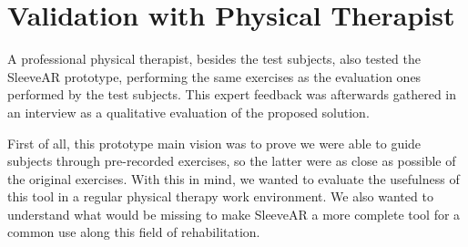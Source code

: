 \begin{table}[!t]
\centering
{}
\caption{T-Student Test for all exercises. SleeveAR(S), Video(V)}
\label{table:ttest}
\end{table}


\section{Validation with Physical Therapist}
\label{sec:pt}

A professional physical therapist, besides the test subjects, also tested the SleeveAR prototype, performing the same exercises as the evaluation ones performed by the test subjects. This expert feedback was afterwards gathered in an interview as a qualitative evaluation of the proposed solution.

First of all, this prototype main vision was to prove we were able to guide subjects through pre-recorded exercises, so the latter were as close as possible of the original exercises. With this in mind, we wanted to evaluate the usefulness of this tool in a regular physical therapy work environment. We also wanted to understand what would be missing to make SleeveAR a more complete tool for a common use along this field of rehabilitation.

